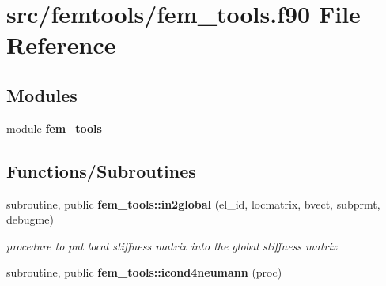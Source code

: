 \section{src/femtools/fem\+\_\+tools.f90 File Reference}
\label{fem__tools_8f90}
\subsection*{Modules}
\begin{DoxyCompactItemize}
\item 
module {\bf fem\+\_\+tools}
\end{DoxyCompactItemize}
\subsection*{Functions/\+Subroutines}
\begin{DoxyCompactItemize}
\item 
subroutine, public {\bf fem\+\_\+tools\+::in2global} (el\+\_\+id, locmatrix, bvect, subprmt, debugme)
\begin{DoxyCompactList}\small\item\em procedure to put local stiffness matrix into the global stiffness matrix \end{DoxyCompactList}\item 
subroutine, public {\bf fem\+\_\+tools\+::icond4neumann} (proc)
\end{DoxyCompactItemize}
